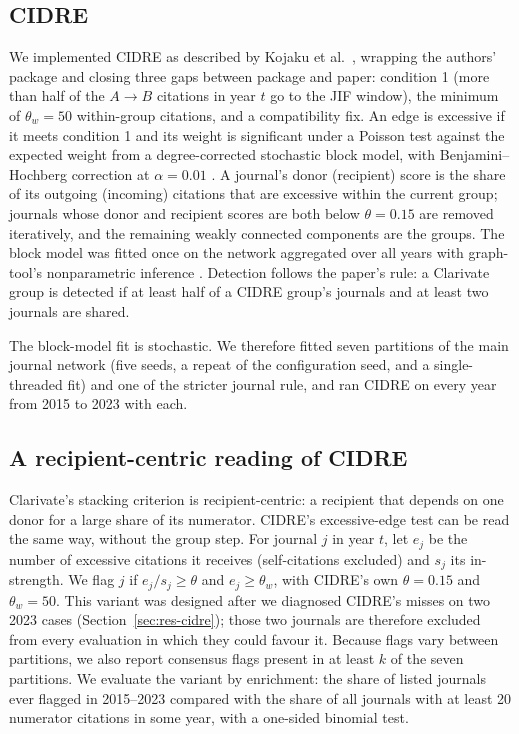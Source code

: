 \documentclass[11pt]{article}
\begin{document}
\subsection{CIDRE}
We implemented CIDRE as described by Kojaku et al.\ \cite{kojaku2021cidre}, wrapping the authors' package and closing
three gaps between package and paper: condition 1 (more than half of the $A\!\to\!B$ citations in year $t$ go to the
JIF window), the minimum of $\theta_w=50$ within-group citations, and a compatibility fix. An edge is excessive if it
meets condition 1 and its weight is significant under a Poisson test against the expected weight from a
degree-corrected stochastic block model, with Benjamini--Hochberg correction at $\alpha=0.01$
\cite{benjamini1995}. A journal's donor (recipient) score is the share of its outgoing (incoming) citations that are
excessive within the current group; journals whose donor and recipient scores are both below $\theta=0.15$ are
removed iteratively, and the remaining weakly connected components are the groups. The block model was fitted once on
the network aggregated over all years with graph-tool's nonparametric inference
\cite{peixoto2017nonparametric,peixoto2014graphtool}. Detection follows the paper's rule: a Clarivate group is detected
if at least half of a CIDRE group's journals and at least two journals are shared.

The block-model fit is stochastic. We therefore fitted seven partitions of the main journal network (five seeds, a
repeat of the configuration seed, and a single-threaded fit) and one of the stricter journal rule, and ran CIDRE on
every year from 2015 to 2023 with each.

\subsection{A recipient-centric reading of CIDRE}
Clarivate's stacking criterion is recipient-centric: a recipient that depends on one donor for a large share of its
numerator. CIDRE's excessive-edge test can be read the same way, without the group step. For journal $j$ in year
$t$, let $e_j$ be the number of excessive citations it receives (self-citations excluded) and $s_j$ its in-strength.
We flag $j$ if $e_j/s_j \ge \theta$ and $e_j \ge \theta_w$, with CIDRE's own $\theta=0.15$ and $\theta_w=50$. This
variant was designed after we diagnosed CIDRE's misses on two 2023 cases (Section~\ref{sec:res-cidre}); those two
journals are therefore excluded from every evaluation in which they could favour it. Because flags vary between
partitions, we also report consensus flags present in at least $k$ of the seven partitions. We evaluate the variant by
enrichment: the share of listed journals ever flagged in 2015--2023 compared with the share of all journals with at
least 20 numerator citations in some year, with a one-sided binomial test.
\end{document}
